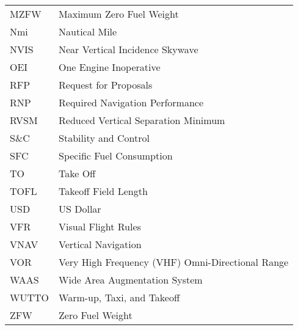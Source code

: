 {\begin{longtable*}{@{}l @{\quad=\quad} l@{}}
    MZFW & Maximum Zero Fuel Weight \\
    Nmi & Nautical Mile \\
    NVIS & Near Vertical Incidence Skywave \\
    OEI & One Engine Inoperative \\
    RFP & Request for Proposals \\
    RNP & Required Navigation Performance \\
    RVSM & Reduced Vertical Separation Minimum \\
    S\&C & Stability and Control \\
    SFC & Specific Fuel Consumption \\
    TO & Take Off \\
    TOFL & Takeoff Field Length \\
    USD & US Dollar \\
    VFR & Visual Flight Rules \\
    VNAV & Vertical Navigation \\
    VOR & Very High Frequency (VHF) Omni-Directional Range \\
    WAAS & Wide Area Augmentation System \\
    WUTTO & Warm-up, Taxi, and Takeoff \\
    ZFW & Zero Fuel Weight\\
\end{longtable*}}

